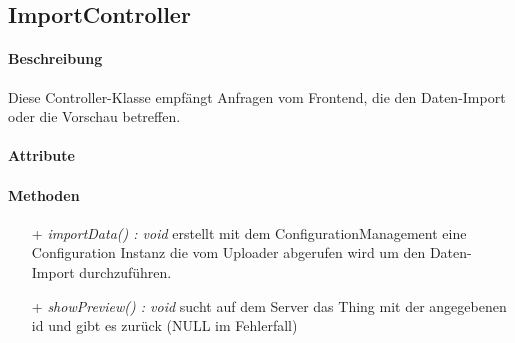 \subsection{ImportController}

\paragraph{Beschreibung}
Diese Controller-Klasse empfängt Anfragen vom Frontend, die den Daten-Import oder die Vorschau betreffen.


\paragraph{Attribute}

\paragraph{Methoden}
\begin{itemize}
\item[+] \textit{ importData() : void}
 erstellt mit dem ConfigurationManagement eine Configuration Instanz die vom Uploader abgerufen wird um den Daten-Import durchzuführen.
\item[+] \textit{showPreview() : void}
sucht auf dem Server das Thing mit der angegebenen id und gibt es zurück (NULL im Fehlerfall)
\end{itemize}